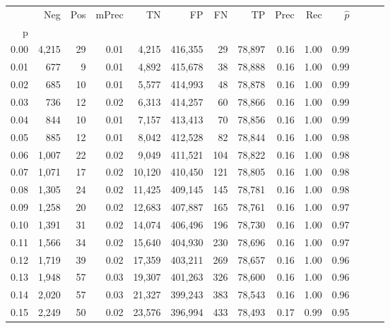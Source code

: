 \begin{tabular}{rrrrrrrrrrrrrr}
\toprule
{} &    Neg &    Pos & mPrec &       TN &       FP &      FN &      TP &  Prec &   Rec & $\hat{p}$ \\
p    &        &        &       &          &          &         &         &       &       &           \\
\midrule
0.00 &  4,215 &     29 &  0.01 &    4,215 &  416,355 &      29 &  78,897 &  0.16 &  1.00 &      0.99 \\
0.01 &    677 &      9 &  0.01 &    4,892 &  415,678 &      38 &  78,888 &  0.16 &  1.00 &      0.99 \\
0.02 &    685 &     10 &  0.01 &    5,577 &  414,993 &      48 &  78,878 &  0.16 &  1.00 &      0.99 \\
0.03 &    736 &     12 &  0.02 &    6,313 &  414,257 &      60 &  78,866 &  0.16 &  1.00 &      0.99 \\
0.04 &    844 &     10 &  0.01 &    7,157 &  413,413 &      70 &  78,856 &  0.16 &  1.00 &      0.99 \\
0.05 &    885 &     12 &  0.01 &    8,042 &  412,528 &      82 &  78,844 &  0.16 &  1.00 &      0.98 \\
0.06 &  1,007 &     22 &  0.02 &    9,049 &  411,521 &     104 &  78,822 &  0.16 &  1.00 &      0.98 \\
0.07 &  1,071 &     17 &  0.02 &   10,120 &  410,450 &     121 &  78,805 &  0.16 &  1.00 &      0.98 \\
0.08 &  1,305 &     24 &  0.02 &   11,425 &  409,145 &     145 &  78,781 &  0.16 &  1.00 &      0.98 \\
0.09 &  1,258 &     20 &  0.02 &   12,683 &  407,887 &     165 &  78,761 &  0.16 &  1.00 &      0.97 \\
0.10 &  1,391 &     31 &  0.02 &   14,074 &  406,496 &     196 &  78,730 &  0.16 &  1.00 &      0.97 \\
0.11 &  1,566 &     34 &  0.02 &   15,640 &  404,930 &     230 &  78,696 &  0.16 &  1.00 &      0.97 \\
0.12 &  1,719 &     39 &  0.02 &   17,359 &  403,211 &     269 &  78,657 &  0.16 &  1.00 &      0.96 \\
0.13 &  1,948 &     57 &  0.03 &   19,307 &  401,263 &     326 &  78,600 &  0.16 &  1.00 &      0.96 \\
0.14 &  2,020 &     57 &  0.03 &   21,327 &  399,243 &     383 &  78,543 &  0.16 &  1.00 &      0.96 \\
0.15 &  2,249 &     50 &  0.02 &   23,576 &  396,994 &     433 &  78,493 &  0.17 &  0.99 &      0.95 \\

\end{tabular}
